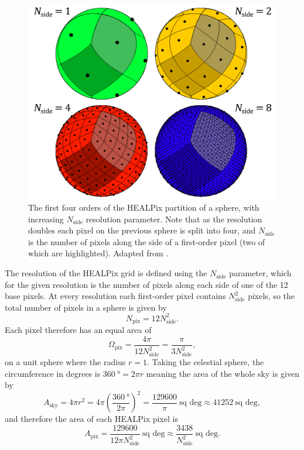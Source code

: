\begin{colsection}
\begin{colsection}
\begin{figure}[t]
    \begin{center}
        \includegraphics[width=0.7\linewidth]{images/healpix.pdf}
    \end{center}
    \caption[HEALPix partitions of a sphere]{
        The first four orders of the HEALPix partition of a sphere, with increasing $N_\text{side}$ resolution parameter. Note that as the resolution doubles each pixel on the previous sphere is split into four, and $N_\text{side}$ is the number of pixels along the side of a first-order pixel (two of which are highlighted). Adapted from \citet{HEALPix}.
    }\label{fig:healpix}
\end{figure}

The resolution of the HEALPix grid is defined using the $N_\text{side}$ parameter, which for the given resolution is the number of pixels along each side of one of the 12 base pixels. At every resolution each first-order pixel contains $N_\text{side}^2$ pixels, so the total number of pixels in a sphere is given by
%
\begin{equation}
    N_\text{pix} = 12 N_\text{side}^2.
    \label{eq:healpix_npix}
\end{equation}
%
Each pixel therefore has an equal area of
%
\begin{equation}
    \Omega_\text{pix} = \frac{4\pi}{12 N_\text{side}^2} = \frac{\pi}{3 N_\text{side}^2},
    \label{eq:healpix_area}
\end{equation}
%
on a unit sphere where the radius $r=1$. Taking the celestial sphere, the circumference in degrees is $\SI{360}{\degree} = 2 \pi r$ meaning the area of the whole sky is given by
%
\begin{equation}
    A_\text{sky} = 4 \pi r^2 = 4 \pi \left ( \frac{\SI{360}{\degree}}{2 \pi} \right )^2 = \frac{129600}{\pi}~\text{sq deg} \approx 41252~\text{sq deg} , %
    \label{eq:sky_area}
\end{equation}
%
and therefore the area of each HEALPix pixel is
%
\begin{equation}
    A_\text{pix} = \frac{129600}{12 \pi N_\text{side}^2}~\text{sq~deg} \approx \frac{3438}{N_\text{side}^2}~\text{sq~deg}.
    \label{eq:healpix_area_degrees}
\end{equation}


\end{colsection}
\end{colsection}
